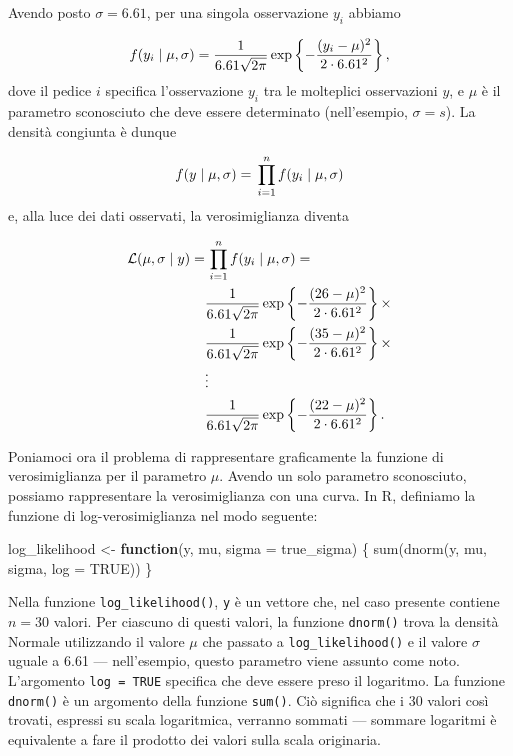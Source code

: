 \documentclass[
]{memoir}
\newenvironment{Shaded}{\begin{snugshade}}{\end{snugshade}}
\newcommand{\AttributeTok}[1]{\textcolor[rgb]{0.77,0.63,0.00}{#1}}
\newcommand{\ConstantTok}[1]{\textcolor[rgb]{0.00,0.00,0.00}{#1}}
\newcommand{\ControlFlowTok}[1]{\textcolor[rgb]{0.13,0.29,0.53}{\textbf{#1}}}
\newcommand{\FunctionTok}[1]{\textcolor[rgb]{0.00,0.00,0.00}{#1}}
\newcommand{\NormalTok}[1]{#1}
\newcommand{\OtherTok}[1]{\textcolor[rgb]{0.56,0.35,0.01}{#1}}
\newcommand{\R}{\textsf{R}} %
\theoremstyle{definition}
\theoremstyle{definition}
\theoremstyle{definition}
\theoremstyle{definition}
\theoremstyle{remark}
\begin{document}
Avendo posto \(\sigma = 6.61\), per una singola osservazione \(y_i\) abbiamo

\[
f(y_i \mid \mu, \sigma) = \frac{1}{{6.61 \sqrt {2\pi}}}\exp\left\{{-\frac{(y_i - \mu)^2}{2\cdot 6.61^2}}\right\},\notag
\]
dove il pedice \(i\) specifica l'osservazione \(y_i\) tra le molteplici osservazioni \(y\), e \(\mu\) è il parametro sconosciuto che deve essere determinato (nell'esempio, \(\sigma = s\)). La densità congiunta è dunque

\[
f(y \mid \mu, \sigma) = \, \prod_{i=1}^n f(y_i \mid \mu, \sigma)\notag
\]
e, alla luce dei dati osservati, la verosimiglianza diventa

\[
\begin{aligned}
\mathcal{L}(\mu, \sigma \mid y) =& \, \prod_{i=1}^n f(y_i \mid \mu, \sigma) = \notag\\
& \frac{1}{{6.61 \sqrt {2\pi}}}\exp\left\{{-\frac{(26 - \mu)^2}{2\cdot 6.61^2}}\right\} \times \notag\\
 & \frac{1}{{6.61 \sqrt {2\pi}}}\exp\left\{{-\frac{(35 - \mu)^2}{2\cdot 6.61^2}}\right\} \times  \notag\\
& \vdots \notag\\
 & \frac{1}{{6.61 \sqrt {2\pi}}}\exp\left\{{-\frac{(22 - \mu)^2}{2\cdot 6.61^2}}\right\}.
\end{aligned}
\label{eq:lldepression}
\]

Poniamoci ora il problema di rappresentare graficamente la funzione di verosimiglianza per il parametro \(\mu\). Avendo un solo parametro sconosciuto, possiamo rappresentare la verosimiglianza con una curva. In \R, definiamo la funzione di log-verosimiglianza nel modo seguente:

\begin{Shaded}
\begin{Highlighting}[]
\NormalTok{log\_likelihood }\OtherTok{\textless{}{-}} \ControlFlowTok{function}\NormalTok{(y, mu, }\AttributeTok{sigma =}\NormalTok{ true\_sigma) \{}
  \FunctionTok{sum}\NormalTok{(}\FunctionTok{dnorm}\NormalTok{(y, mu, sigma, }\AttributeTok{log =} \ConstantTok{TRUE}\NormalTok{))}
\NormalTok{\}}
\end{Highlighting}
\end{Shaded}

Nella funzione \texttt{log\_likelihood()}, \texttt{y} è un vettore che, nel caso presente contiene \(n = 30\) valori. Per ciascuno di questi valori, la funzione \texttt{dnorm()} trova la densità Normale utilizzando il valore \(\mu\) che passato a \texttt{log\_likelihood()} e il valore \(\sigma\) uguale a 6.61 --- nell'esempio, questo parametro viene assunto come noto. L'argomento \texttt{log\ =\ TRUE} specifica che deve essere preso il logaritmo. La funzione \texttt{dnorm()} è un argomento della funzione \texttt{sum()}. Ciò significa che i 30 valori così trovati, espressi su scala logaritmica, verranno sommati --- sommare logaritmi è equivalente a fare il prodotto dei valori sulla scala originaria.
\end{document}
